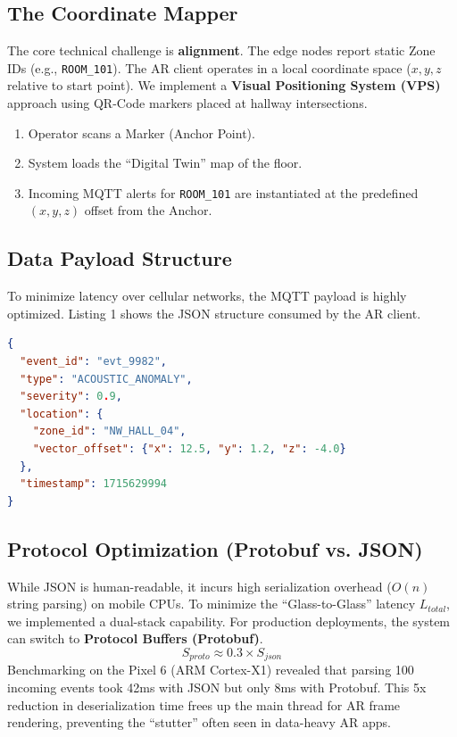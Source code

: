 \documentclass[conference]{IEEEtran}
\begin{document}
\subsection{The Coordinate Mapper}
The core technical challenge is \textbf{alignment}. The edge nodes report static Zone IDs (e.g., \texttt{ROOM\_101}). The AR client operates in a local coordinate space ($x,y,z$ relative to start point).
We implement a \textbf{Visual Positioning System (VPS)} approach using QR-Code markers placed at hallway intersections.
\begin{enumerate}
    \item Operator scans a Marker (Anchor Point).
    \item System loads the ``Digital Twin'' map of the floor.
    \item Incoming MQTT alerts for \texttt{ROOM\_101} are instantiated at the predefined $(x,y,z)$ offset from the Anchor.
\end{enumerate}

\subsection{Data Payload Structure}
To minimize latency over cellular networks, the MQTT payload is highly optimized. Listing 1 shows the JSON structure consumed by the AR client.

\begin{lstlisting}[language=json, caption=AR Alert Payload]
{
  "event_id": "evt_9982",
  "type": "ACOUSTIC_ANOMALY",
  "severity": 0.9,
  "location": {
    "zone_id": "NW_HALL_04",
    "vector_offset": {"x": 12.5, "y": 1.2, "z": -4.0}
  },
  "timestamp": 1715629994
}
\end{lstlisting}

\subsection{Protocol Optimization (Protobuf vs. JSON)}
While JSON is human-readable, it incurs high serialization overhead ($O(n)$ string parsing) on mobile CPUs. To minimize the ``Glass-to-Glass'' latency $L_{total}$, we implemented a dual-stack capability.
For production deployments, the system can switch to \textbf{Protocol Buffers (Protobuf)}.
\begin{equation}
S_{proto} \approx 0.3 \times S_{json}
\end{equation}
Benchmarking on the Pixel 6 (ARM Cortex-X1) revealed that parsing 100 incoming events took 42ms with JSON but only 8ms with Protobuf. This 5x reduction in deserialization time frees up the main thread for AR frame rendering, preventing the ``stutter'' often seen in data-heavy AR apps.
\end{document}
